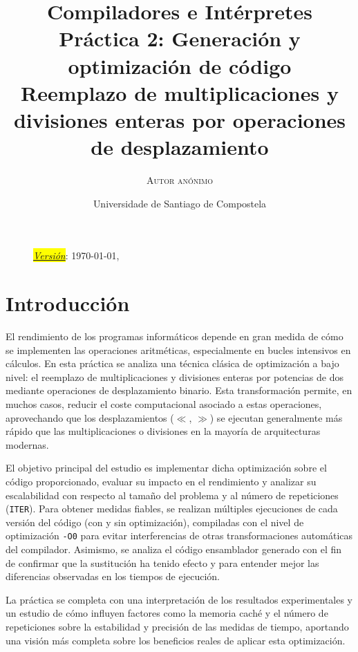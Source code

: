 \documentclass[11pt,a4paper,twoside]{article}
\title{%
	\LARGE \textbf{Compiladores e Intérpretes} \\ \vspace*{1cm} \textbf{Práctica 2: Generación y optimización de código}
	\\ \Large \textbf{Reemplazo de multiplicaciones y divisiones enteras por operaciones de desplazamiento}}
\author{\textsc{Autor anónimo}}
\date{Universidade de Santiago de Compostela}
\theoremstyle{definition}
\begin{document}
	
	\maketitle
	\thispagestyle{empty}
	
	\vspace*{1cm}
	
	\renewcommand{\contentsname}{Índice} %
	\tableofcontents
	
	\vfill
	
	\begin{figure}[H]
		\centering
		\textit{\underline{\colorbox{yellow}{Versión}}}: \today, \currenttime
	\end{figure}


	\newpage


	\section{Introducción}
	
	El rendimiento de los programas informáticos depende en gran medida de cómo se implementen las operaciones aritméticas, especialmente en bucles intensivos en cálculos. En esta práctica se analiza una técnica clásica de optimización a bajo nivel: el reemplazo de multiplicaciones y divisiones enteras por potencias de dos mediante operaciones de desplazamiento binario. Esta transformación permite, en muchos casos, reducir el coste computacional asociado a estas operaciones, aprovechando que los desplazamientos ($\ll$, $\gg$) se ejecutan generalmente más rápido que las multiplicaciones o divisiones en la mayoría de arquitecturas modernas.
	
	El objetivo principal del estudio es implementar dicha optimización sobre el código proporcionado, evaluar su impacto en el rendimiento y analizar su escalabilidad con respecto al tamaño del problema y al número de repeticiones (\texttt{ITER}). Para obtener medidas fiables, se realizan múltiples ejecuciones de cada versión del código (con y sin optimización), compiladas con el nivel de optimización \texttt{-O0} para evitar interferencias de otras transformaciones automáticas del compilador. Asimismo, se analiza el código ensamblador generado con el fin de confirmar que la sustitución ha tenido efecto y para entender mejor las diferencias observadas en los tiempos de ejecución.
	
	La práctica se completa con una interpretación de los resultados experimentales y un estudio de cómo influyen factores como la memoria caché y el número de repeticiones sobre la estabilidad y precisión de las medidas de tiempo, aportando una visión más completa sobre los beneficios reales de aplicar esta optimización.
	
\end{document}
